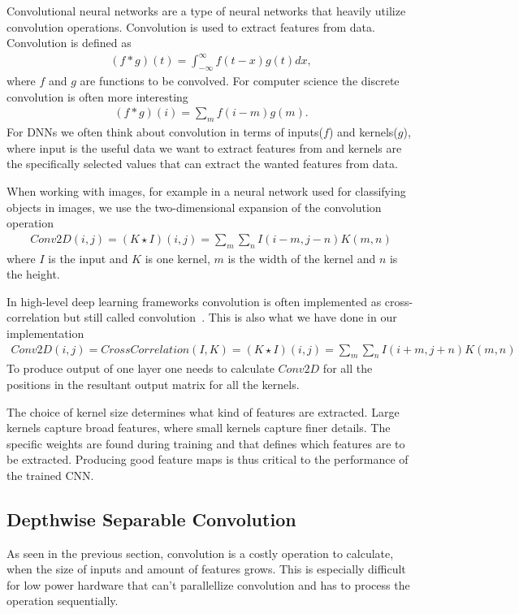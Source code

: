 \documentclass[12pt,a4paper,english
]{tunithesis}
\begin{document}
Convolutional neural networks are a type of neural networks that heavily utilize convolution operations. Convolution is used to extract features from data.
Convolution is defined as
\begin{align}
(f \ast g)(t) = \int_{-\infty}^{\infty}f(t-x)g(t)dx,
\end{align}
where $f$ and $g$ are functions to be convolved. For computer science the discrete convolution is often more interesting
\begin{align}
(f \ast g)(i) = \sum_{m}f(i-m)g(m).
\end{align}
For DNNs we often think about convolution in terms of inputs($f$) and kernels($g$), where input is the useful data we want to extract features from and kernels are the specifically selected values that can extract the wanted features from data.

When working with images, for example in a neural network used for classifying objects in images, we use the two-dimensional expansion of the convolution operation
\begin{align}
Conv2D(i, j) = (K \star I)(i,j) = \sum_{m}\sum_{n}I(i-m,j-n)K(m, n)
\end{align}
where $I$ is the input and $K$ is one kernel, $m$ is the width of the kernel and $n$ is the height.

In high-level deep learning frameworks convolution is often implemented as cross-correlation but still called convolution~\cite{DeepLearningBook,paszke_pytorch_2019,tensorflow2015-whitepaper}. This is also what we have done in our implementation
\begin{align}
Conv2D(i,j) = CrossCorrelation(I, K) = (K \star I)(i,j) = \sum_{m}\sum_{n}I(i+m,j+n)K(m, n)
\end{align}
To produce output of one layer one needs to calculate $Conv2D$ for all the positions in the resultant output matrix for all the kernels.

The choice of kernel size determines what kind of features are extracted. Large kernels capture broad features, where small kernels capture finer details.
The specific weights are found during training and that defines which features are to be extracted. Producing good feature maps is thus critical to the performance of the trained CNN.

\subsection{Depthwise Separable Convolution}
As seen in the previous section, convolution is a costly operation to calculate, when the size of inputs and amount of features grows. This is especially difficult for low power hardware that can't parallellize convolution and has to process the operation sequentially.
\end{document}
